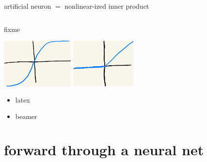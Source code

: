 \documentclass[xcolor={svgnames},
               hyperref={colorlinks,citecolor=DeepPink4,linkcolor=FireBrick,urlcolor=Maroon}]
               {beamer}
\begin{document}
\begin{frame}{artificial neuron $=$ nonlinear-ized inner product}
\begin{columns}
\begin{column}{0.45\textwidth}
\end{column}
\end{columns}
\end{frame}

\begin{frame}{fixme}

\includegraphics[height=25mm]{figs/sigmoid} \quad \includegraphics[height=25mm]{figs/relu}

\begin{itemize}
\item latex
\item beamer
\end{itemize}
\end{frame}


\section{forward through a neural net}
\end{document}
